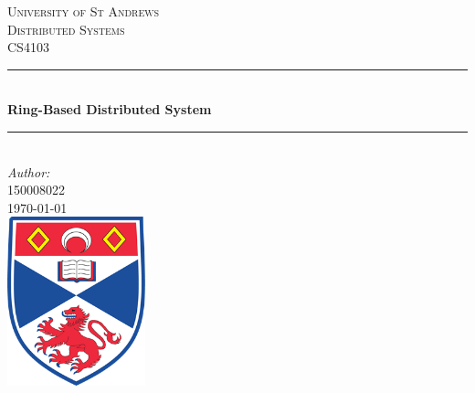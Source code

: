 \documentclass[12pt]{article}
\begin{document}
\begin{titlepage}

\newcommand{\HRule}{\rule{\linewidth}{0.5mm}} %

\center %
 

\textsc{\LARGE University of St Andrews}\\[1.5cm] %
\textsc{\Large Distributed Systems}\\[0.5cm] %
\textsc{\large CS4103}\\[0.5cm] %


\HRule \\[0.4cm]
{ \huge \bfseries Ring-Based Distributed System}\\[0.4cm] %
\HRule \\[1.5cm]
 


\Large \emph{Author:}\\
 \textsc{150008022}\\[1cm] %
 

{\large \today}\\[2cm] %


\includegraphics[width = 4cm]{images/standrewslogo.png}
 

\end{titlepage}
\end{document}
